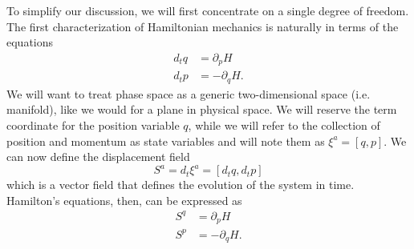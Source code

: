 To simplify our discussion, we will first concentrate on a single degree of freedom. The first characterization of Hamiltonian mechanics is naturally in terms of the equations
\begin{equation}\label{rp-cm-hsd-condEquations}
	\tag{HM-1D}
	\begin{aligned}
		d_t q &= \partial_p H \\
		d_t p &= - \partial_q H.
	\end{aligned}
\end{equation}
We will want to treat phase space as a generic two-dimensional space (i.e. manifold), like we would for a plane in physical space. We will reserve the term coordinate for the position variable $q$, while we will refer to the collection of position and momentum as state variables and will note them as $\xi^a = [q, p]$. We can now define the displacement field
\begin{equation}\label{rp-cm-displacement1d}
	S^a = d_t \xi^a = [d_t q, d_t p]
\end{equation}
which is a vector field that defines the evolution of the system in time. Hamilton's equations, then, can be expressed as
\begin{equation}\label{rp-cm-hsd-displacementCurl}
	\begin{aligned}
		S^q &= \partial_p H \\
		S^p &= - \partial_q H.
	\end{aligned}
\end{equation}

